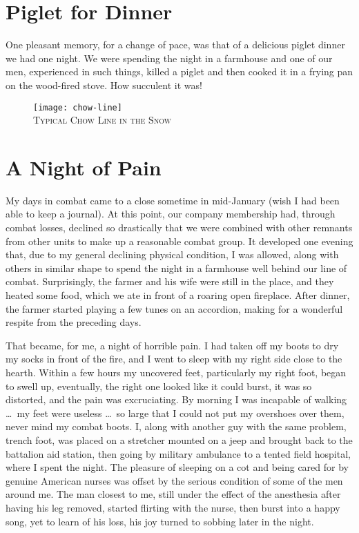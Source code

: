 \documentclass[../m3y]{subfiles}
\begin{document}
\section{Piglet for Dinner}
One pleasant memory, for a change of pace, was that of a delicious piglet dinner we had one night. We were spending the night in a farmhouse and one of our men, experienced in such things, killed a piglet and then cooked it in a frying pan on the wood-fired stove. How succulent it was!

\begin{figure}[h]
\centering
\texttt{[image: chow-line]}\\
\medskip
{\newtimes\textsc{Typical Chow Line in the Snow}}
\end{figure}

\section{A Night of Pain}
My days in combat came to a close sometime in mid-January (wish I had been able to keep a journal). At this point, our company membership had, through combat losses, declined so drastically that we were combined with other remnants from other units to make up a reasonable combat group. It developed one evening that, due to my general declining physical condition, I was allowed, along with others in similar shape to spend the night in a farmhouse well behind our line of combat. Surprisingly, the farmer and his wife were still in the place, and they heated some food, which we ate in front of a roaring open fireplace. After dinner, the farmer started playing a few tunes on an accordion, making for a wonderful respite from the preceding days.

That became, for me, a night of horrible pain. I had taken off my boots to dry my socks in front of the fire, and I went to sleep with my right side close to the hearth. Within a few hours my uncovered feet, particularly my right foot, began to swell up, eventually, the right one looked like it could burst, it was so distorted, and the pain was excruciating. By morning I was incapable of walking \ldots\ my feet were useless \ldots\ so large that I could not put my overshoes over them, never mind my combat boots. I, along with another guy with the same problem, trench foot, was placed on a stretcher mounted on a jeep and brought back to the battalion aid station, then going by military ambulance to a tented field hospital, where I spent the night. The pleasure of sleeping on a cot and being cared for by genuine American nurses was offset by the serious condition of some of the men around me. The man closest to me, still under the effect of the anesthesia after having his leg removed, started flirting with the nurse, then burst into a happy song, yet to learn of his loss, his joy turned to sobbing later in the night.
\end{document}
